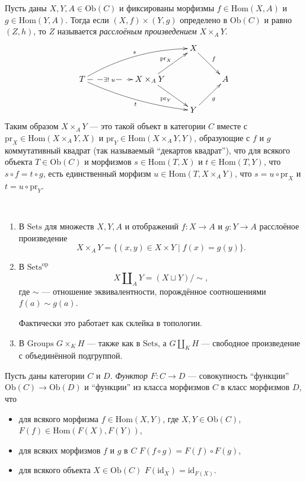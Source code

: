 \documentclass[12pt,a4paper]{article}
\newcommand{\op}{\mathrm{op}}
\newcommand{\Hom}{\mathrm{Hom}}
\newcommand{\Ob}{\mathrm{Ob}}
\newcommand{\id}{\mathrm{id}}
\newcommand{\Sets}{\mathrm{Sets}}
\newcommand{\Groups}{\mathrm{Groups}}
\newcommand{\pr}{\mathrm{pr}}
\begin{document}
    \begin{definition}
        Пусть даны $X, Y, A \in \Ob(C)$ и фиксированы морфизмы $f \in \Hom(X, A)$ и $g \in \Hom(Y, A)$. Тогда если $(X, f) \times (Y, g)$ определено в $\Ob(C)$ и равно $(Z, h)$, то $Z$ называется \emph{расслоёным произведением} $X \times_A Y$.
        \[
            \xymatrix{
                &&& X \ar[rd]^{f}\\
                T \ar@/^1em/[rrru]^{s} \ar@/_/[rrrd]_{t} \ar@{-->}[rr]|(0.4){\,\exists!\; u\,} && X \times_A Y \ar[ru]^{\pr_X} \ar[rd]_{\pr_Y} && A\\
                &&& Y \ar[ru]_{g}
            }
        \]
        Таким образом $X \times_A Y$ --- это такой объект в категории $C$ вместе с $\pr_X \in \Hom(X \times_A Y, X)$ и $\pr_Y \in \Hom(X \times_A Y, Y)$, образующие с $f$ и $g$ коммутативный квадрат (так называемый ``декартов квадрат''), что для всякого объекта $T \in \Ob(C)$ и морфизмов $s \in \Hom(T, X)$ и $t \in \Hom(T, Y)$, что $s \circ f = t \circ g$, есть единственный морфизм $u \in \Hom(T, X \times_A Y)$, что $s = u \circ \pr_X$ и $t = u \circ \pr_Y$.
    \end{definition}

    \begin{example}\ 
        \begin{enumerate}
            \item В $\Sets$ для множеств $X, Y, A$ и отображений $f: X \to A$ и $g: Y \to A$ расслоёное произведение
                \[X \times_A Y = \{(x, y) \in X \times Y \mid f(x) = g(y)\}.\]
            \item В $\Sets^\op$
                \[X \amalg_A Y = (X \sqcup Y) / {\sim},\]
                где $\sim$ --- отношение эквивалентности, порождённое соотношениями $f(a) \sim g(a)$.
                
                Фактически это работает как склейка в топологии.
            \item В $\Groups$ $G \times_K H$ --- также как в $\Sets$, а $G \amalg_K H$ --- свободное произведение с объединённой подгруппой.
        \end{enumerate}
    \end{example}

    \begin{definition}
        Пусть даны категории $C$ и $D$. \emph{Функтор} $F: C \to D$ --- совокупность ``функции'' $\Ob(C) \to \Ob(D)$ и ``функции'' из класса морфизмов $C$ в класс морфизмов $D$, что
        \begin{itemize}
            \item для всякого морфизма $f \in \Hom(X, Y)$, где $X, Y \in \Ob(C)$, $F(f) \in \Hom(F(X), F(Y))$,
            \item для всяких морфизмов $f$ и $g$ в $C$ $F(f \circ g) = F(f) \circ F(g)$,
            \item для всякого объекта $X \in \Ob(C)$ $F(\id_X) = \id_{F(X)}$.
        \end{itemize}
    \end{definition}
\end{document}

